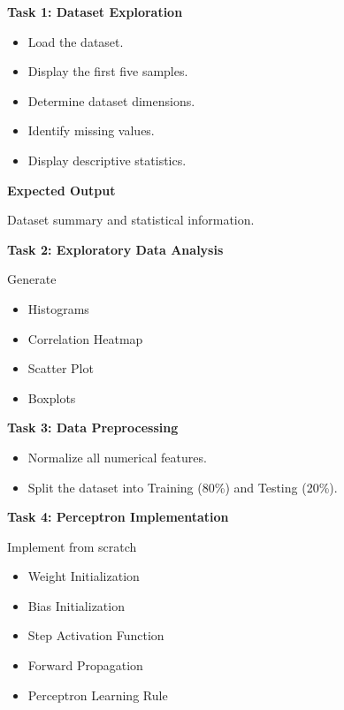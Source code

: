 \documentclass[11pt]{article}
\begin{document}
\textbf{Task 1: Dataset Exploration}

\begin{itemize}
\item Load the dataset.
\item Display the first five samples.
\item Determine dataset dimensions.
\item Identify missing values.
\item Display descriptive statistics.
\end{itemize}

\textbf{Expected Output}

Dataset summary and statistical information.

\vspace{2mm}

\textbf{Task 2: Exploratory Data Analysis}

Generate

\begin{itemize}
\item Histograms
\item Correlation Heatmap
\item Scatter Plot
\item Boxplots
\end{itemize}

\vspace{2mm}

\textbf{Task 3: Data Preprocessing}

\begin{itemize}
\item Normalize all numerical features.
\item Split the dataset into Training (80\%) and Testing (20\%).
\end{itemize}

\vspace{2mm}

\textbf{Task 4: Perceptron Implementation}

Implement from scratch

\begin{itemize}
\item Weight Initialization
\item Bias Initialization
\item Step Activation Function
\item Forward Propagation
\item Perceptron Learning Rule
\end{itemize}
\end{document}
